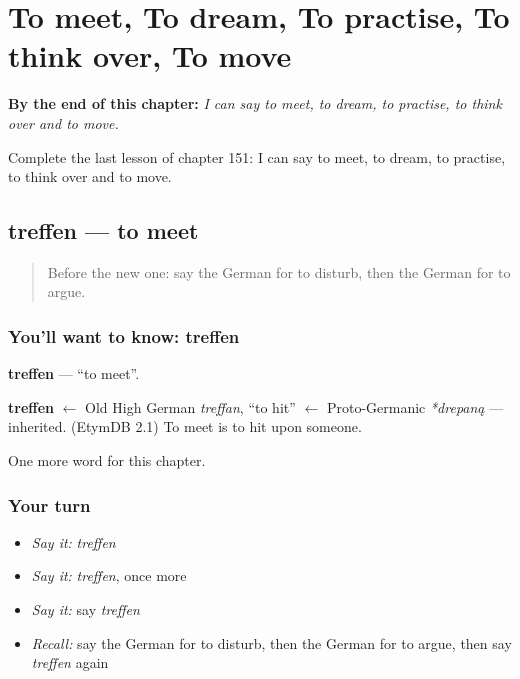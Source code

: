 
\chapter{To meet, To dream, To practise, To think over, To move}
\label{ch:ge-to-meet-to-dream-to-practise-to-think-over-to-move}

\begin{chapteropening}
\textbf{By the end of this chapter:} \emph{I can say to meet, to dream, to practise, to think over and to move.}

Complete the last lesson of chapter 151: I can say to meet, to dream, to practise, to think over and to move.
\end{chapteropening}

\section[treffen]{treffen — to meet}

\label{lesson:GE-C151-treffen}



\begin{quote}
Before the new one: say the German for to disturb, then the German for to argue.
\end{quote}

\subsection*{You'll want to know: treffen}
\textbf{treffen} — \textquotedblleft{}to meet\textquotedblright{}.

\begin{cousinweb}
\textbf{treffen} $\leftarrow$ Old High German \emph{treffan}, \textquotedblleft{}to hit\textquotedblright{} $\leftarrow$ Proto-Germanic \emph{*drepaną} — inherited. (EtymDB 2.1) To meet is to hit upon someone.
\end{cousinweb}

\begin{grammarlens}[title={What you've built}]
One more word for this chapter.
\end{grammarlens}

\subsection*{Your turn}
\begin{itemize}
\raggedright
  \item \emph{Say it:} \emph{treffen}
  \item \emph{Say it:} \emph{treffen}, once more
  \item \emph{Say it:} say \emph{treffen}
  \item \emph{Recall:} say the German for to disturb, then the German for to argue, then say \emph{treffen} again
\end{itemize}

